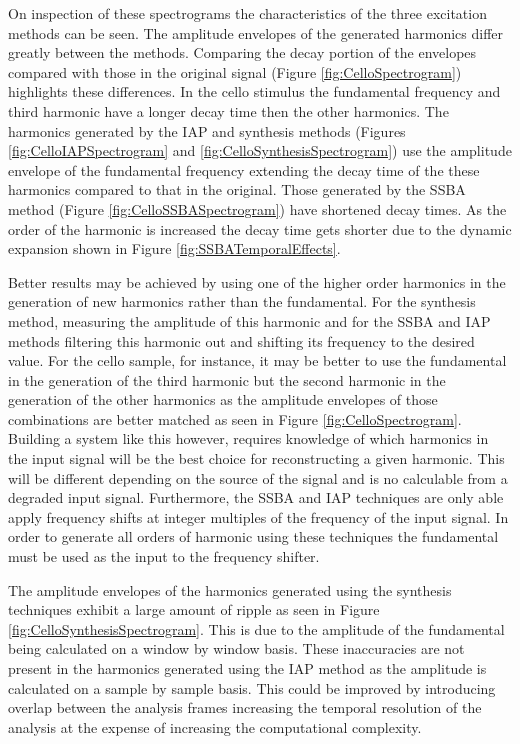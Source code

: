 		On inspection of these spectrograms the characteristics of the three excitation methods can be seen.
		The amplitude envelopes of the generated harmonics differ greatly between the methods. Comparing the
		decay portion of the envelopes compared with those in the original signal (Figure
		\ref{fig:CelloSpectrogram}) highlights these differences. In the cello stimulus the fundamental
		frequency and third harmonic have a longer decay time then the other harmonics. The harmonics
		generated by the IAP and synthesis methods (Figures \ref{fig:CelloIAPSpectrogram} and
		\ref{fig:CelloSynthesisSpectrogram}) use the amplitude envelope of the fundamental frequency
		extending the decay time of the these harmonics compared to that in the original. Those generated by
		the SSBA method (Figure \ref{fig:CelloSSBASpectrogram}) have shortened decay times. As the order of
		the harmonic is increased the decay time gets shorter due to the dynamic expansion shown in Figure
		\ref{fig:SSBATemporalEffects}.

		Better results may be achieved by using one of the higher order harmonics in the generation of new
		harmonics rather than the fundamental. For the synthesis method, measuring the amplitude of this harmonic
		and for the SSBA and IAP methods filtering this harmonic out and shifting its frequency to the desired
		value. For the cello sample, for instance, it may be better to use the fundamental in the generation of the
		third harmonic but the second harmonic in the generation of the other harmonics as the amplitude envelopes
		of those combinations are better matched as seen in Figure \ref{fig:CelloSpectrogram}. Building a system
		like this however, requires knowledge of which harmonics in the input signal will be the best choice for
		reconstructing a given harmonic. This will be different depending on the source of the signal and is no
		calculable from a degraded input signal. Furthermore, the SSBA and IAP techniques are only able apply
		frequency shifts at integer multiples of the frequency of the input signal. In order to generate all orders
		of harmonic using these techniques the fundamental must be used as the input to the frequency shifter.

		The amplitude envelopes of the harmonics generated using the synthesis techniques exhibit a large amount of
		ripple as seen in Figure \ref{fig:CelloSynthesisSpectrogram}. This is due to the amplitude of the
		fundamental being calculated on a window by window basis. These inaccuracies are not present in the
		harmonics generated using the IAP method as the amplitude is calculated on a sample by sample basis. This
		could be improved by introducing overlap between the analysis frames increasing the temporal resolution of
		the analysis at the expense of increasing the computational complexity.

